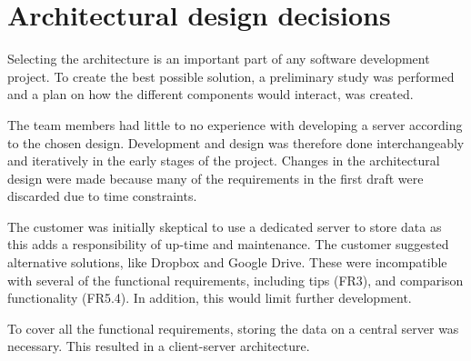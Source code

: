 \section{Architectural design decisions}
\label{sec:arch_design}
Selecting the architecture is an important part of any software development project. To create the best possible solution, a preliminary study was performed and a plan on how the different components would interact, was created. 

The team members had little to no experience with developing a server according to the chosen design. Development and design was therefore done interchangeably and iteratively in the early stages of the project. Changes in the architectural design were made because many of the requirements in the first draft were discarded due to time constraints. 

The customer was initially skeptical to use a dedicated server to store data as this adds a responsibility of up-time and maintenance. The customer suggested alternative solutions, like Dropbox and Google Drive.
These were incompatible with several of the functional requirements, including tips (FR3), and comparison functionality (FR5.4). In addition, this would limit further development. 

To cover all the functional requirements, storing the data on a central server was necessary. This resulted in a client-server architecture. 